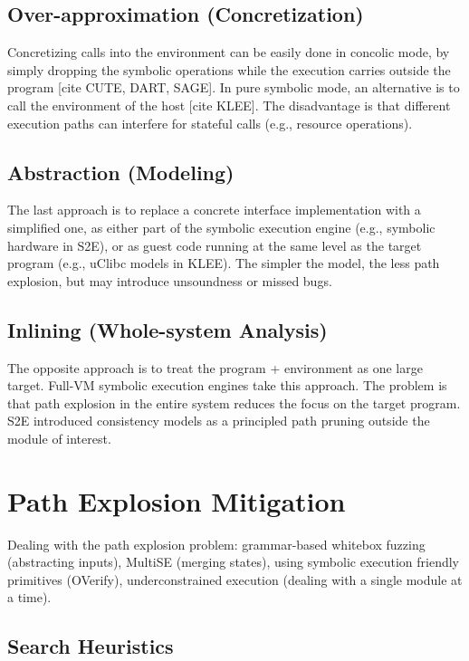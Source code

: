 \subsection{Over-approximation (Concretization)}

Concretizing calls into the environment can be easily done in concolic mode, by simply dropping the symbolic operations while the execution carries outside the program [cite CUTE, DART, SAGE].  In pure symbolic mode, an alternative is to call the environment of the host [cite KLEE].  The disadvantage is that different execution paths can interfere for stateful calls (e.g., resource operations).

\subsection{Abstraction (Modeling)}

The last approach is to replace a concrete interface implementation with a simplified one, as either part of the symbolic execution engine (e.g., symbolic hardware in S2E), or as guest code running at the same level as the target program (e.g., uClibc models in KLEE).  The simpler the model, the less path explosion, but may introduce unsoundness or missed bugs.

\subsection{Inlining (Whole-system Analysis)}

The opposite approach is to treat the program + environment as one large target.  Full-VM symbolic execution engines take this approach.  The problem is that path explosion in the entire system reduces the focus on the target program.  S2E introduced consistency models as a principled path pruning outside the module of interest.


\section{Path Explosion Mitigation}

Dealing with the path explosion problem: grammar-based whitebox fuzzing (abstracting inputs), MultiSE (merging states), using symbolic execution friendly primitives (OVerify), underconstrained execution (dealing with a single module at a time).

\subsection{Search Heuristics}

